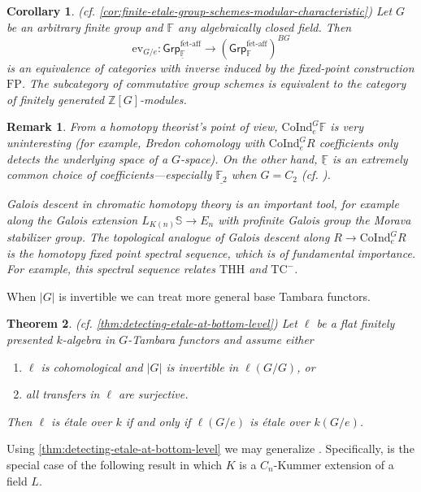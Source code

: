 \documentclass[11pt,dvipsnames]{amsart}
\newcommand{\Z}{\mathbb{Z}}
\newcommand{\F}{\mathbb{F}}
\newtheorem{letterthm}{Theorem}
\newtheorem{lettercor}[letterthm]{Corollary}
\theoremstyle{BoldRemark}
\newtheorem{remark}[theorem]{Remark}
\newcommand{\Coind}{\mathrm{CoInd}}
\newcommand{\FP}{\mathrm{FP}}
\newcommand{\ev}{\mathrm{ev}}
\newcommand{\fet}{\mathsf{Grp}^{\mathrm{f\acute{e}t\text{-}aff}}}
\begin{document}
\begin{lettercor}(cf. \cref{cor:finite-etale-group-schemes-modular-characteristic})
    Let $G$ be an arbitrary finite group and $\F$ any algebraically closed field. Then
    \[ 
        \ev_{G/e} : \fet_{\underline{\F}} \rightarrow (\fet_\F)^{BG} 
    \] 
    is an equivalence of categories with inverse induced by the fixed-point construction $\FP$. The subcategory of commutative group schemes is equivalent to the category of finitely generated $\Z[G]$-modules.
\end{lettercor}

\begin{remark}
    From a homotopy theorist's point of view, $\Coind_e^G \F$ is very uninteresting (for example, Bredon cohomology with $\Coind_e^G R$ coefficients only detects the underlying space of a $G$-space). On the other hand, $\underline{\F}$ is an extremely common choice of coefficients---especially $\underline{\F_2}$ when $G = C_2$ (cf. \cite{BW18,DHM24,HW20,Haz21,May20,Pet24}).
    
    Galois descent in chromatic homotopy theory is an important tool, for example along the Galois extension $L_{K(n)} \mathbb{S} \rightarrow E_n$ with profinite Galois group the Morava stabilizer group. The topological analogue of Galois descent along $R \rightarrow \Coind_e^G R$ is the homotopy fixed point spectral sequence, which is of fundamental importance. For example, this spectral sequence relates $\mathrm{THH}$ and $\mathrm{TC}^-$.
\end{remark}

When $|G|$ is invertible we can treat more general base Tambara functors.

\begin{letterthm}(cf. \cref{thm:detecting-etale-at-bottom-level})
	Let $\ell$ be a flat finitely presented $k$-algebra in $G$-Tambara functors and assume either
	\begin{enumerate}
		\item $\ell$ is cohomological and $|G|$ is invertible in $\ell(G/G)$, or
		\item all transfers in $\ell$ are surjective.
	\end{enumerate}
	Then $\ell$ is \'{e}tale over $k$ if and only if $\ell(G/e)$ is \'{e}tale over $k(G/e)$.
\end{letterthm}

Using \cref{thm:detecting-etale-at-bottom-level} we may generalize \cite[Theorem 4.4]{LRZ24}. Specifically, \cite[Theorem 4.4]{LRZ24} is the special case of the following result in which $K$ is a $C_n$-Kummer extension of a field $L$.
\end{document}
